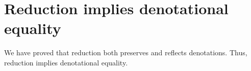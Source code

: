 \begin{fence}
\begin{code}
\>[0][@{}l@{\AgdaIndent{0}}]%
\>[3]\AgdaSpace{}%
\AgdaSymbol{(}\AgdaSpace{}%
\AgdaSpace{}%
\AgdaSpace{}%
\AgdaSymbol{)}\AgdaSpace{}%
\AgdaSymbol{(}\AgdaSpace{}%
\AgdaSpace{}%
\AgdaSpace{}%
\AgdaSymbol{)}\<%
\\
\>[0]\AgdaSpace{}%
\AgdaSymbol{(}\AgdaSpace{}%
\AgdaSpace{}%
\AgdaSymbol{)}\AgdaSpace{}%
\AgdaSpace{}%
\AgdaSpace{}%
\AgdaSymbol{=}\AgdaSpace{}%
\AgdaSpace{}%
\AgdaSymbol{(}\AgdaSpace{}%
\AgdaSpace{}%
\AgdaSpace{}%
\AgdaSymbol{)}\AgdaSpace{}%
\<%
\end{code}
\end{fence}

\hypertarget{reduction-implies-denotational-equality}{%
\section{Reduction implies denotational
equality}\label{reduction-implies-denotational-equality}}

We have proved that reduction both preserves and reflects denotations.
Thus, reduction implies denotational equality.

